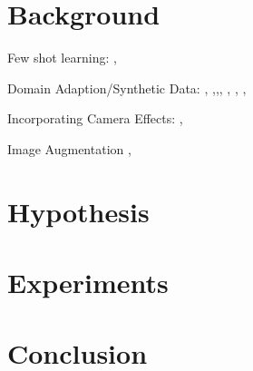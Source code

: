\section{Background}
Few shot learning:
   \cite{Moysset2016}, \cite{Chen2018a}

Domain Adaption/Synthetic Data:
 \cite{Chen2018c}, \cite{Xu2017}
\cite{Tremblay2018a} ,\cite{Inoue},\cite{Peng},
\cite{Rozantsev},  \cite{Le}, \cite{Liu2017}, \cite{Peng2017}

Incorporating Camera Effects:
\cite{Carlson2018},\cite{Vass}

Image Augmentation
 \cite{Bai2017},
 
\section{Hypothesis}

 
\section{Experiments}


\section{Conclusion}




%	
%	

